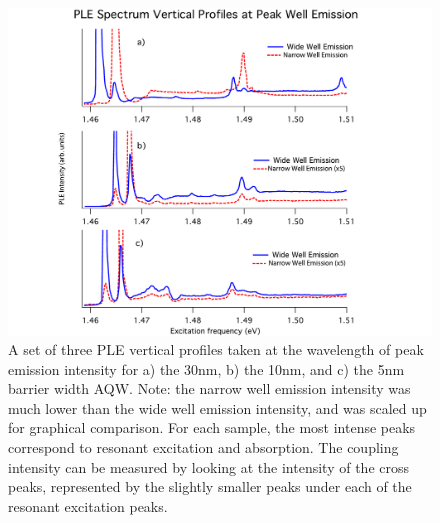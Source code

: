 \begin{figure}[!h]
\centering
\includegraphics[width = \textwidth]{Layout2.pdf}
\caption{ \doublespacing A set of three PLE vertical profiles taken at the wavelength of peak emission intensity for a) the 30nm, b) the 10nm, and c) the 5nm barrier width AQW. Note: the narrow well emission intensity was much lower than the wide well emission intensity, and was scaled up for graphical comparison. For each sample, the most intense peaks correspond to resonant excitation and absorption. The coupling intensity can be measured by looking at the intensity of the cross peaks, represented by the slightly smaller peaks under each of the resonant excitation peaks.} 
\label{traces}
\end{figure}



